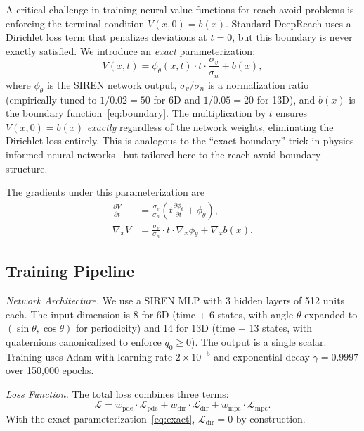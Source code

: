 \documentclass[letterpaper, 10 pt, conference]{ieeeconf}
\begin{document}
A critical challenge in training neural value functions for reach-avoid problems is enforcing the terminal condition $V(x, 0) = b(x)$. Standard DeepReach uses a Dirichlet loss term that penalizes deviations at $t = 0$, but this boundary is never exactly satisfied. We introduce an \emph{exact} parameterization:
\begin{equation}\label{eq:exact}
V(x, t) = \phi_\theta(x, t) \cdot t \cdot \frac{\sigma_v}{\sigma_n} + b(x),
\end{equation}
where $\phi_\theta$ is the SIREN network output, $\sigma_v/\sigma_n$ is a normalization ratio (empirically tuned to $1/0.02 = 50$ for 6D and $1/0.05 = 20$ for 13D), and $b(x)$ is the boundary function~\eqref{eq:boundary}. The multiplication by $t$ ensures $V(x, 0) = b(x)$ \emph{exactly} regardless of the network weights, eliminating the Dirichlet loss entirely. This is analogous to the ``exact boundary'' trick in physics-informed neural networks~\cite{lagaris1998} but tailored here to the reach-avoid boundary structure.

The gradients under this parameterization are
\begin{align}\label{eq:exact_grads}
\frac{\partial V}{\partial t} &= \frac{\sigma_v}{\sigma_n}\!\left(t \frac{\partial \phi_\theta}{\partial t} + \phi_\theta\right)\!,\\
\nabla_x V &= \frac{\sigma_v}{\sigma_n} \cdot t \cdot \nabla_x \phi_\theta + \nabla_x b(x). \nonumber
\end{align}

\subsection{Training Pipeline}

\textit{Network Architecture.}
We use a SIREN MLP with 3 hidden layers of 512 units each. The input dimension is 8 for 6D (time + 6 states, with angle $\theta$ expanded to $(\sin\theta, \cos\theta)$ for periodicity) and 14 for 13D (time + 13 states, with quaternions canonicalized to enforce $q_0 \geq 0$). The output is a single scalar. Training uses Adam with learning rate $2 \times 10^{-5}$ and exponential decay $\gamma = 0.9997$ over 150{,}000 epochs.

\textit{Loss Function.}
The total loss combines three terms:
\begin{equation}\label{eq:loss}
\mathcal{L} = w_{\mathrm{pde}} \cdot \mathcal{L}_{\mathrm{pde}} + w_{\mathrm{dir}} \cdot \mathcal{L}_{\mathrm{dir}} + w_{\mathrm{mpc}} \cdot \mathcal{L}_{\mathrm{mpc}}.
\end{equation}
With the exact parameterization~\eqref{eq:exact}, $\mathcal{L}_{\mathrm{dir}} = 0$ by construction.
\end{document}
